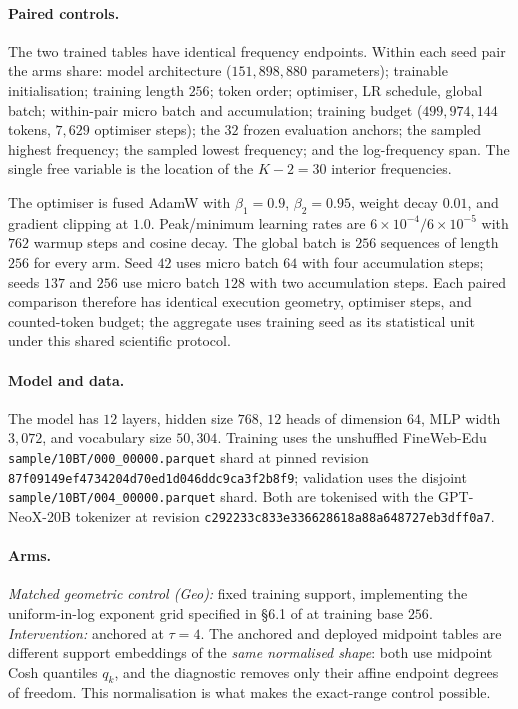 \paragraph{Paired controls.} The two trained tables have identical frequency
endpoints. Within each seed pair the arms share: model architecture ($151{,}898{,}880$
parameters); trainable initialisation; training length $256$; token order;
optimiser, LR schedule, global batch; within-pair micro batch and accumulation;
training budget
($499{,}974{,}144$ tokens, $7{,}629$ optimiser steps); the $32$ frozen
evaluation anchors; the sampled highest frequency; the sampled lowest
frequency; and the log-frequency span. The single free variable is the location
of the $K{-}2 = 30$ interior frequencies.

The optimiser is fused AdamW with $\beta_1{=}0.9$, $\beta_2{=}0.95$, weight
decay $0.01$, and gradient clipping at $1.0$. Peak/minimum learning rates are
$6\times10^{-4}/6\times10^{-5}$ with $762$ warmup steps and cosine decay.
The global batch is $256$ sequences of length $256$ for every arm. Seed $42$
uses micro batch $64$ with four accumulation steps; seeds $137$ and $256$ use
micro batch $128$ with two accumulation steps. Each paired comparison therefore
has identical execution geometry, optimiser steps, and counted-token budget;
the aggregate uses training seed as its statistical unit under this shared
scientific protocol.

\paragraph{Model and data.} The model has $12$ layers, hidden size $768$,
$12$ heads of dimension $64$, MLP width $3{,}072$, and vocabulary size
$50{,}304$. Training uses the unshuffled FineWeb-Edu
\citep{penedo2024fineweb}
\texttt{sample/10BT/000\_00000.parquet} shard at pinned revision
\texttt{87f09149ef4734204d70ed1d046ddc9ca3f2b8f9}; validation uses the disjoint
\texttt{sample/10BT/004\_00000.parquet} shard. Both are tokenised with the
GPT-NeoX-20B tokenizer \citep{black2022gptneox} at revision
\texttt{c292233c833e336628618a88a648727eb3dff0a7}.

\paragraph{Arms.} \emph{Matched geometric control (Geo):} fixed training support,
implementing the uniform-in-log exponent grid specified in \S6.1 of
\citet{oka2026fmrope} at training base $256$.
\emph{Intervention:} anchored \evq{} at $\tau{=}4$. The anchored and
deployed midpoint \evq{} tables are different support
embeddings of the \emph{same normalised shape}: both use midpoint Cosh
quantiles $q_k$, and the diagnostic removes only their affine endpoint degrees
of freedom. This normalisation is what makes the exact-range control possible.

